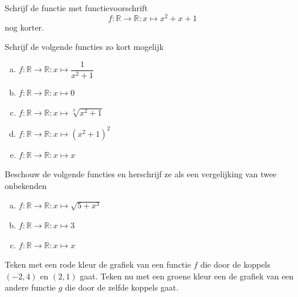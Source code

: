 \documentclass[12pt,twoside]{article}
\begin{document}
\begin{oefening}
Schrijf de functie met functievoorschrift
$$f:\mathbb{R}\to\mathbb{R}:x\mapsto x^2+x+1$$
nog korter.
\end{oefening}

\begin{oefening}
Schrijf de volgende functies zo kort mogelijk
\begin{enumerate}[(a)]
  \item $f:\mathbb{R}\to\mathbb{R}:x\mapsto \dfrac{1}{x^2+1}$
  \item $f:\mathbb{R}\to\mathbb{R}:x\mapsto 0$
  \item $f:\mathbb{R}\to\mathbb{R}:x\mapsto \sqrt[3]{x^2+1}$
  \item $f:\mathbb{R}\to\mathbb{R}:x\mapsto \left(x^2+1\right)^2$
  \item $f:\mathbb{R}\to\mathbb{R}:x\mapsto x$
\end{enumerate}
\end{oefening}

\begin{oefening}
Beschouw de volgende functies en herschrijf ze als een vergelijking van twee onbekenden
\begin{enumerate}[(a)]
  \item $f:\mathbb{R}\to\mathbb{R}:x\mapsto \sqrt{5+x^3}$
  \item $f:\mathbb{R}\to\mathbb{R}:x\mapsto 3$
  \item $f:\mathbb{R}\to\mathbb{R}:x\mapsto x$
\end{enumerate}
\end{oefening}

\begin{oefening}
Teken met een rode kleur de grafiek van een functie $f$ die door de koppels $(-2, 4)$ en $(2,1)$ gaat. Teken nu met een groene kleur een de grafiek van een andere functie $g$ die door de zelfde koppels gaat.
\end{oefening}
\end{document}
